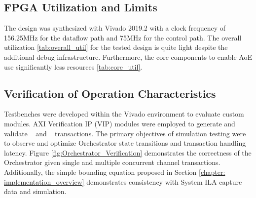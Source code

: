 \subsection{FPGA Utilization and Limits}
The design was synthesized with Vivado 2019.2 with a clock frequency of 156.25MHz for the dataflow path and 75MHz for the control path. The overall utilization \ref{tab:overall_util} for the tested design is quite light despite the additional debug infrastructure. Furthermore, the core components to enable AoE use significantly less resources \ref{tab:core_util}.

 


\subsection{Verification of Operation Characteristics}

Testbenches were developed within the Vivado environment to evaluate custom modules. AXI Verification IP (VIP) modules were employed to generate and validate \axifull~ and \axistream~ transactions. The primary objectives of simulation testing were to observe and optimize Orchestrator state transitions and transaction handling latency. Figure \ref{fig:Orchestrator_Verification} demonstrates the correctness of the Orchestrator given single and multiple concurrent channel transactions. Additionally, the simple bounding equation proposed in Section \ref{chapter: implementation_overview} demonstrates consistency with System ILA capture data and simulation.




